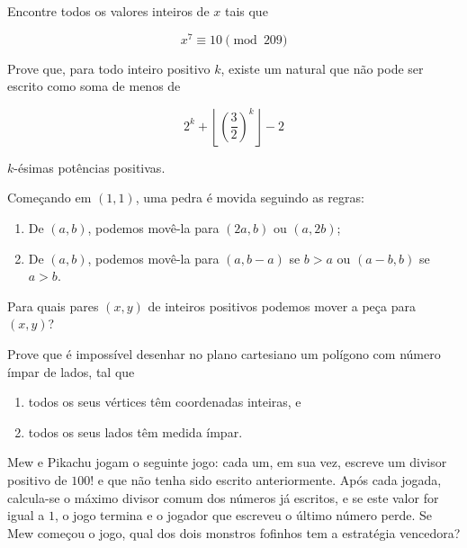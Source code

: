\begin{questao}
  Encontre todos os valores inteiros de $x$ tais que 

  $$ x^7 \equiv 10 \pmod{209} $$
\end{questao}

\begin{questao}
  Prove que, para todo inteiro positivo $k$, existe um natural que
  não pode ser escrito como soma de menos de

  $$ 2^k + \left \lfloor \left( \frac{3}{2} \right)^k \right \rfloor -
  2 $$

  $k$-ésimas potências positivas.
\end{questao}

\begin{questao}
  Começando em $(1,1)$, uma pedra é movida seguindo as regras:
  \begin{enumerate}[label=\emph{\alph*})]
    \item De $(a,b)$, podemos movê-la para $(2a,b)$ ou $(a,2b)$;

    \item De $(a,b)$, podemos movê-la para $(a,b-a)$ se $b>a$
    ou $(a-b,b)$ se $a>b$.
  \end{enumerate}

  Para quais pares $(x,y)$ de inteiros positivos podemos mover a
  peça para $(x,y)$?
\end{questao}

\begin{questao}
  Prove que é impossível desenhar no plano cartesiano um polígono com
  número ímpar de lados, tal que
  \begin{enumerate}[label=\emph{\roman*})]
    \item todos os seus vértices têm coordenadas inteiras, e
    \item todos os seus lados têm medida ímpar.
    \end{enumerate}
\end{questao}

\begin{questao}
  Mew e Pikachu jogam o seguinte jogo: cada um, em sua vez, escreve um
  divisor positivo de $100!$ e que não tenha sido escrito
  anteriormente. Após cada jogada, calcula-se o máximo divisor comum
  dos números já escritos, e se este valor for igual a $1$, o jogo
  termina e o jogador que escreveu o último número perde. Se Mew
  começou o jogo, qual dos dois monstros fofinhos tem a estratégia
  vencedora?
\end{questao}

